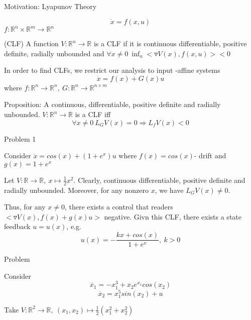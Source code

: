 Motivation: Lyapunov Theory

\begin{equation*}
\dot{x} = f(x,u)
\end{equation*}
$f:\mathbb{R}^n \times \mathbb{R}^m \to \mathbb{R}^n$

\begin{Definition}
(CLF) A function $V: \mathbb{R}^n \to \mathbb{R}$ is a CLF if it is continuous differentiable, positive definite, radially unbounded and $ \forall x \neq 0 \ \inf_{u}< \triangledown V(x), f(x,u) > < 0$ 
\end{Definition}

In order to find CLFs, we restrict our analysis to input -affine systems
\begin{equation*}
\dot{x} = f(x) + G(x)u
\end{equation*}
where $f: \mathbb{R}^n \to \mathbb{R}^n, \ G: \mathbb{R}^n \to \mathbb{R}^{n \times m}$

Proposition: A continuous, differentiable, positive definite and radially unbounded. $V: \mathbb{R}^n \to \mathbb{R}$ is a CLF iff 
\begin{equation*}
\forall x \neq 0 \ L_GV(x) = 0 \Rightarrow L_fV(x) < 0
\end{equation*}

Problem 1

Consider $\dot{x} = cos(x) + (1+e^x)u$ where $f(x) = cos(x)$- drift and $g(x) = 1+e^x$

Let $V: \mathbb{R} \to \mathbb{R}, \ x \mapsto \frac{1}{2}x^2$. Clearly, continuous differentiable, positive definite and radially unbounded. Moreover, for any nonzero $x$, we have $L_GV(x) \neq 0$. 

Thus, for any $x \neq 0$, there exists a control that readers $<\triangledown V(x), f(x) + g(x)u>$ negative. 
Givn this CLF, there exists a state feedback $u = u(x)$, e.g. 
\begin{equation*}
u(x) = - \frac{kx+cos(x)}{1+e^x}, \ k > 0
\end{equation*}

Problem

Consider 
\begin{equation*}
\dot{x_1} = -x_1^3 + x_2e^{x_1}cos(x_2)
\end{equation*}  
\begin{equation*}
\dot{x_2} = x_1^5sin(x_2) + u
\end{equation*}

Take $V: \mathbb{R}^2 \to \mathbb{R}, \ (x_1, x_2) \mapsto \frac{1}{2}(x_1^2 + x_2^2)$

